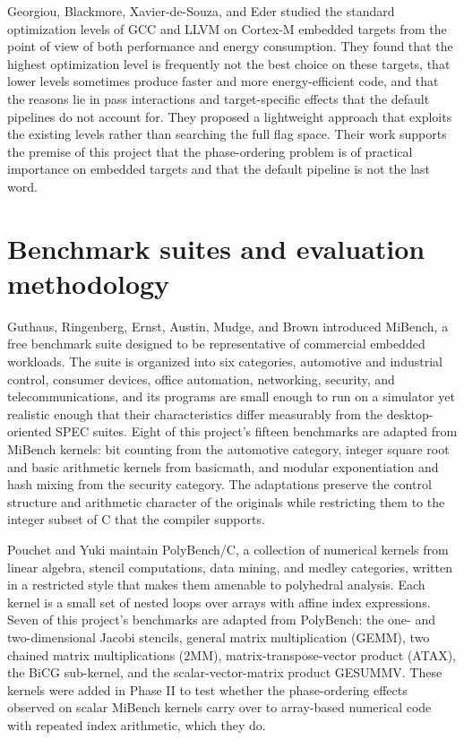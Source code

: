 Georgiou, Blackmore, Xavier-de-Souza, and Eder \cite{georgiou2018} studied the standard optimization levels of GCC and LLVM on Cortex-M embedded targets from the point of view of both performance and energy consumption. They found that the highest optimization level is frequently not the best choice on these targets, that lower levels sometimes produce faster and more energy-efficient code, and that the reasons lie in pass interactions and target-specific effects that the default pipelines do not account for. They proposed a lightweight approach that exploits the existing levels rather than searching the full flag space. Their work supports the premise of this project that the phase-ordering problem is of practical importance on embedded targets and that the default pipeline is not the last word.

\section*{Benchmark suites and evaluation methodology}

Guthaus, Ringenberg, Ernst, Austin, Mudge, and Brown \cite{guthaus2001} introduced MiBench, a free benchmark suite designed to be representative of commercial embedded workloads. The suite is organized into six categories, automotive and industrial control, consumer devices, office automation, networking, security, and telecommunications, and its programs are small enough to run on a simulator yet realistic enough that their characteristics differ measurably from the desktop-oriented SPEC suites. Eight of this project's fifteen benchmarks are adapted from MiBench kernels: bit counting from the automotive category, integer square root and basic arithmetic kernels from basicmath, and modular exponentiation and hash mixing from the security category. The adaptations preserve the control structure and arithmetic character of the originals while restricting them to the integer subset of C that the compiler supports.

Pouchet and Yuki \cite{pouchet2016} maintain PolyBench/C, a collection of numerical kernels from linear algebra, stencil computations, data mining, and medley categories, written in a restricted style that makes them amenable to polyhedral analysis. Each kernel is a small set of nested loops over arrays with affine index expressions. Seven of this project's benchmarks are adapted from PolyBench: the one- and two-dimensional Jacobi stencils, general matrix multiplication (GEMM), two chained matrix multiplications (2MM), matrix-transpose-vector product (ATAX), the BiCG sub-kernel, and the scalar-vector-matrix product GESUMMV. These kernels were added in Phase II to test whether the phase-ordering effects observed on scalar MiBench kernels carry over to array-based numerical code with repeated index arithmetic, which they do.

